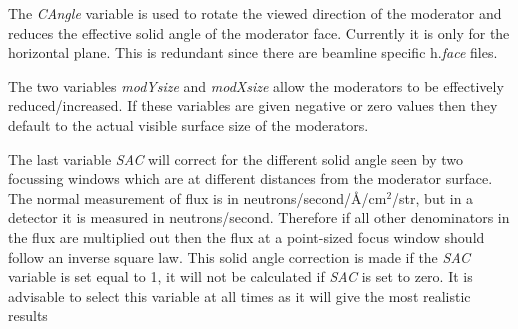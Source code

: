The {\it CAngle} variable is used to rotate the viewed direction
of the moderator and reduces the effective solid angle of the
moderator face. Currently it is only for the horizontal plane.
This is redundant since there are beamline specific h.{\it{face}} files.

The two variables {\it modYsize} and {\it modXsize}
allow the moderators to be effectively reduced/increased. If
these variables are given  negative or zero values then they default to the actual
visible surface size of the moderators.

The last variable {\it SAC} will correct for the different solid angle seen by two
focussing windows which are at different distances from the moderator surface. The
normal measurement of flux is in neutrons/second/\AA/cm{$^2$}/str, but in a detector
it is measured in neutrons/second. Therefore if all other denominators in the flux are
multiplied out then the flux at a point-sized focus window should follow an inverse square law.
This solid angle correction is made if the {\it SAC} variable is set equal to 1, it will not be
calculated if {\it SAC} is set to zero. It is advisable to select this variable at all times as it will give the most realistic results


